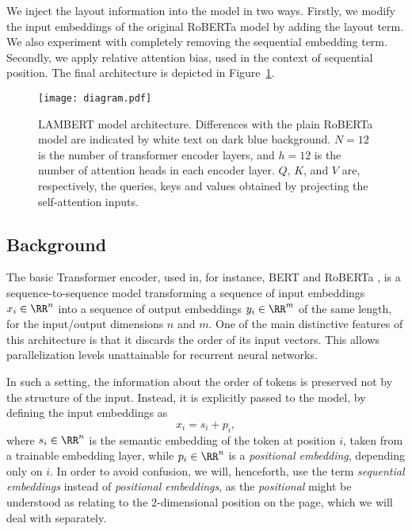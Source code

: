 We inject the layout information into the model in two ways. Firstly, we modify
the input embeddings of the original RoBERTa model by adding the layout term. We
also experiment with completely removing the sequential embedding term.
Secondly, we apply relative attention bias, used
 in the context of sequential position.
The final architecture is depicted in Figure~\ref{fig:architecture}.

\begin{figure}[htb]
  \centering
  \texttt{[image: diagram.pdf]}
  \caption{LAMBERT model architecture. Differences with the plain RoBERTa model
    are indicated by white text on dark blue background. \(N=12\) is the number
    of transformer encoder layers, and \(h=12\) is the number of attention heads
    in each encoder layer. \(Q\), \(K\), and \(V\) are, respectively, the queries,
    keys and values obtained by projecting the self-attention inputs.}
  \label{fig:architecture}
\end{figure}

\subsection{Background}
\label{sec:bert}

The basic Transformer encoder, used in, for instance, BERT
\citep{devlin2019-bert} and RoBERTa \citep{liu2019-roberta}, is a
sequence-to-sequence model transforming a sequence of input embeddings
\(x_i\in\RR^n\) into a sequence of output embeddings \(y_i\in\RR^m\) of the same
length, for the input/output dimensions \(n\) and \(m\). One of the main
distinctive features of this architecture is that it discards the order of its
input vectors. This allows parallelization levels unattainable for recurrent neural
networks.

In such a setting, the information about the order of tokens is preserved not by
the structure of the input. Instead, it is explicitly passed to the model, by
defining the input embeddings as
\begin{equation}
  \label{eq:bert-emb}
  x_i = s_i + p_i,
\end{equation}
where \(s_i\in\RR^n\) is the semantic embedding of the token at position \(i\),
taken from a trainable embedding layer, while \(p_i\in\RR^n\) is a
\emph{positional embedding}, depending only on \(i\). In order to avoid
confusion, we will, henceforth, use the term \emph{sequential embeddings}
instead of \emph{positional embeddings}, as the \emph{positional} might be
understood as relating to the 2-dimensional position on the page, which we will
deal with separately.

